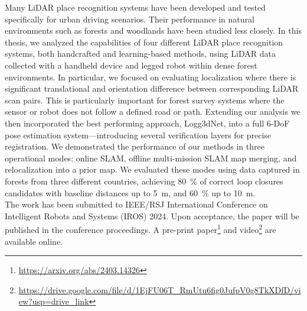 
Many LiDAR place recognition systems have been developed and tested specifically for urban driving scenarios. Their performance in natural environments such as forests and woodlands have been studied less closely.
In this thesis, we analyzed the capabilities of four different LiDAR place recognition systems, both handcrafted and learning-based methods, using LiDAR data collected with a handheld device and legged robot within dense forest environments. 
In particular, we focused on evaluating localization where there is significant translational and orientation difference between corresponding LiDAR scan pairs. This is particularly important for forest survey systems where the sensor or robot does not follow a defined road or path. 
Extending our analysis we then incorporated the best performing approach, Logg3dNet, into a full 6-DoF pose estimation system---introducing several verification layers for precise registration. 
We demonstrated the performance of our methods in three operational modes: online SLAM, offline multi-mission SLAM map merging, and relocalization into a prior map. 
We evaluated these modes using data captured in forests from three different countries, achieving \SI{80}{\percent} of correct loop closures candidates with baseline distances up to \SI{5}{\meter}, and \SI{60}{\percent} up to \SI{10}{\meter}.  \\

The work has been submitted to IEEE/RSJ International Conference on Intelligent Robots and Systems (IROS) 2024. Upon acceptance, the paper will be published in the conference proceedings. A pre-print paper\footnote{\url{https://arxiv.org/abs/2403.14326}} and video\footnote{ \url{https://drive.google.com/file/d/1EjFU06T_RmUtu6fig0JufpV0g8TkXDfD/view?usp=drive_link}} are available online. 
